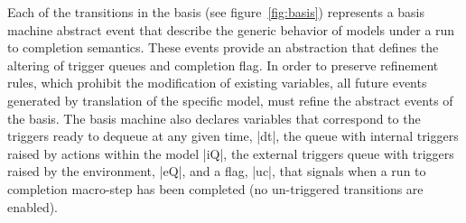 


Each of the transitions in the basis (see figure~\ref{fig:basis}) 
represents a basis machine abstract event that
describe the generic behavior of models under a run to completion semantics.
These events provide an abstraction that defines the altering of trigger queues 
and completion flag. In order to preserve refinement rules, 
which prohibit the modification of existing variables,
all future events generated by translation of the specific \SCXML model, 
must refine the abstract events of the basis.
The basis machine also declares variables that correspond 
to the triggers ready to dequeue at any given time, |dt|,
the queue with internal triggers raised by actions within the model |iQ|, 
the external triggers queue with triggers raised by the environment, |eQ|,
and a flag, |uc|, that signals when a run to completion macro-step has been completed 
(no un-triggered transitions are enabled). 


